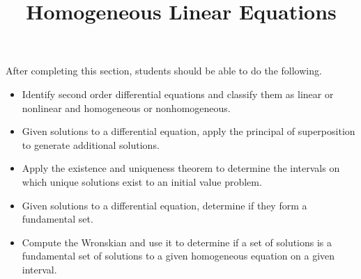 \documentclass{ximera}
\title{Homogeneous Linear Equations}
\begin{document}
\begin{abstract}
\end{abstract}

\maketitle

\begin{sectionOutcomes}

After completing this section, students should be able to do the following.

\begin{itemize}
	\item Identify second order differential equations and classify them as linear or nonlinear and homogeneous or nonhomogeneous.
	\item Given solutions to a differential equation, apply the principal of superposition to generate additional solutions.
	\item Apply the existence and uniqueness theorem to determine the intervals on which unique solutions exist to an initial value problem.
	\item Given solutions to a differential equation, determine if they form a fundamental set.
	\item Compute the Wronskian and use it to determine if a set of solutions is a fundamental set of solutions to a given homogeneous equation on a given interval.
\end{itemize}

\end{sectionOutcomes}
\end{document}
